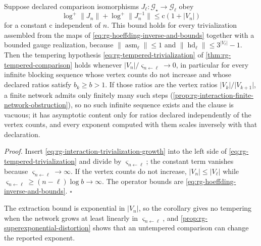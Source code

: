 Suppose declared comparison isomorphisms
\(J_\ell:\mathcal G_\star\to\mathcal G_\ell\) obey
\begin{equation}
\log^+\lVert J_n\rVert+\log^+\lVert J_n^{-1}\rVert
\leq\mathrm c\left(1+\lvert V_n\rvert\right)
\label{eq:rg-interaction-trivialization-growth}
\end{equation}
for a constant \(\mathrm c\) independent of \(n\). This bound holds for every
trivialization assembled from the maps of
\eqref{eq:rg-hoeffding-inverse-and-bounds} together with a bounded gauge
realization, because \(\lVert\operatorname{asm}_\ell\rVert\leq1\) and
\(\lVert\operatorname{hd}_\ell\rVert\leq3^{\lvert V_\ell\rvert}-1\). Then the tempering
hypothesis \eqref{eq:rg-tempered-trivialization} of
\cref{thm:rg-tempered-comparison} holds whenever
\(\lvert V_n\rvert/\varsigma_{n\leftarrow\ell}\to0\), in particular for every
infinite blocking sequence whose vertex counts do not increase and whose
declared ratios satisfy \(b_k\geq b>1\). If those ratios are the vertex ratios
\(\lvert V_k\rvert/\lvert V_{k+1}\rvert\), a finite network admits only
finitely many such steps (\cref{prop:rg-interaction-finite-network-obstruction}),
so no such infinite sequence exists and the clause is vacuous; it has
asymptotic content only for ratios declared independently of the vertex
counts, and every exponent computed with them scales inversely with that
declaration. 

\noindent\emph{Proof.}
Insert \eqref{eq:rg-interaction-trivialization-growth} into the left side of
\eqref{eq:rg-tempered-trivialization} and divide by
\(\varsigma_{n\leftarrow\ell}\); the constant term vanishes because
\(\varsigma_{n\leftarrow\ell}\to\infty\). If the vertex counts do not increase,
\(\lvert V_n\rvert\leq\lvert V_\ell\rvert\) while
\(\varsigma_{n\leftarrow\ell}\geq(n-\ell)\log b\to\infty\). The operator bounds
are \eqref{eq:rg-hoeffding-inverse-and-bounds}. \(\square\)

The extraction bound is exponential in \(\lvert V_n\rvert\), so the corollary
gives no tempering when the network grows at least linearly in
\(\varsigma_{n\leftarrow\ell}\), and
\cref{prop:rg-superexponential-distortion} shows that an untempered comparison
can change the reported exponent.

